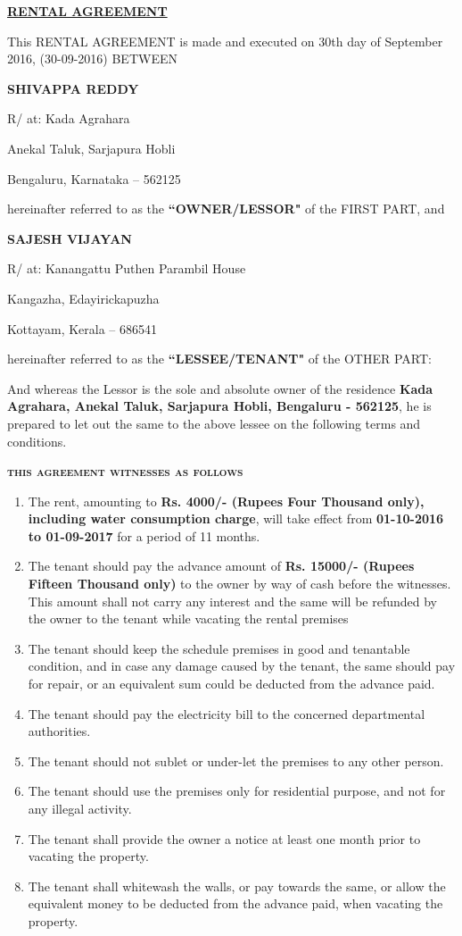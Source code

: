 \documentclass[12pt, twoside, a4paper]{article}
\newcommand{\PersonDetails}[5]{
		\textbf{\MakeUppercase{#1}} \par                            %
		{R/ at: #2} \par					          %
		#3 \par                                                                        %
		#4 -- #5 						          %
}
\begin{document}
\vspace*{\fill}

\centerline{\uline{\textbf{\Large RENTAL AGREEMENT}}}

\bigskip

This RENTAL AGREEMENT is made and executed on 30th day of September 2016, (30-09-2016) BETWEEN
\bigskip

\PersonDetails{Shivappa Reddy}{Kada Agrahara}{Anekal Taluk, Sarjapura Hobli}{Bengaluru, Karnataka}{562125}

\pagebreak

hereinafter referred to as the \textbf{``OWNER/LESSOR"} of the FIRST PART, and
\bigskip

\PersonDetails{Sajesh Vijayan}{Kanangattu Puthen Parambil House}{Kangazha, Edayirickapuzha}{Kottayam, Kerala}{686541}

\bigskip
hereinafter referred to as the \textbf{``LESSEE/TENANT"} of the OTHER PART:

\bigskip

And whereas the Lessor is the sole and absolute owner of the residence \textbf{Kada Agrahara, Anekal Taluk, Sarjapura Hobli, Bengaluru - 562125}, he is prepared to let out the same to the above lessee on the following terms and conditions.

\bigskip
\bigskip

{\Large \textbf{\textsc{this agreement witnesses as follows}}}

\begin{enumerate}
\item {The rent, amounting to \textbf{Rs. 4000/- (Rupees Four Thousand only), including water consumption charge}, will take effect from \textbf{01-10-2016 to 01-09-2017} for a period of 11 months.}
\item {The tenant should pay the advance amount of \textbf{Rs. 15000/- (Rupees Fifteen Thousand only)} to the owner by way of cash before the witnesses. This amount shall not carry any interest and the same will be refunded by the owner to the tenant while vacating the rental premises}
\item {The tenant should keep the schedule premises in good and tenantable condition, and in case any damage caused by the tenant, the same should pay for repair, or an equivalent sum could be deducted from the advance paid.}
\item {The tenant should pay the electricity bill to the concerned departmental authorities.}
\item {The tenant should not sublet or under-let the premises to any other person.}
\item {The tenant should use the premises only for residential purpose, and not for any illegal activity.}
\item {The tenant shall provide the owner a notice at least one month prior to vacating the property.}
\item {The tenant shall whitewash the walls, or pay towards the same, or allow the equivalent money to be deducted from the advance paid, when vacating the property.}
\end {enumerate}
\end{document}

